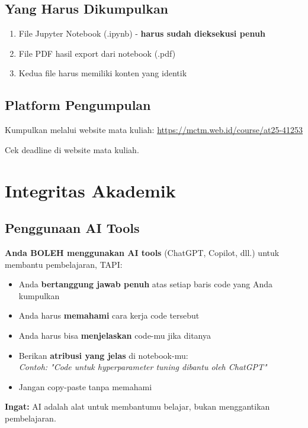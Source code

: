 \documentclass[12pt,a4paper]{article}
\begin{document}
\subsection{Yang Harus Dikumpulkan}
\begin{enumerate}
    \item File Jupyter Notebook (.ipynb) - \textbf{harus sudah dieksekusi penuh}
    \item File PDF hasil export dari notebook (.pdf)
    \item Kedua file harus memiliki konten yang identik
\end{enumerate}

\subsection{Platform Pengumpulan}
Kumpulkan melalui website mata kuliah: \url{https://mctm.web.id/course/at25-41253}

Cek deadline di website mata kuliah.

\section{Integritas Akademik}

\subsection{Penggunaan AI Tools}
\begin{tcolorbox}[colback=yellow!10!white,colframe=orange!75!black,title=Kebijakan Penggunaan AI]
\textbf{Anda BOLEH menggunakan AI tools} (ChatGPT, Copilot, dll.) untuk membantu pembelajaran, TAPI:

\begin{itemize}
    \item Anda \textbf{bertanggung jawab penuh} atas setiap baris code yang Anda kumpulkan
    \item Anda harus \textbf{memahami} cara kerja code tersebut
    \item Anda harus bisa \textbf{menjelaskan} code-mu jika ditanya
    \item Berikan \textbf{atribusi yang jelas} di notebook-mu: \\
    \textit{Contoh: "Code untuk hyperparameter tuning dibantu oleh ChatGPT"}
    \item Jangan copy-paste tanpa memahami
\end{itemize}

\textbf{Ingat:} AI adalah alat untuk membantumu belajar, bukan menggantikan pembelajaran.
\end{tcolorbox}
\end{document}
